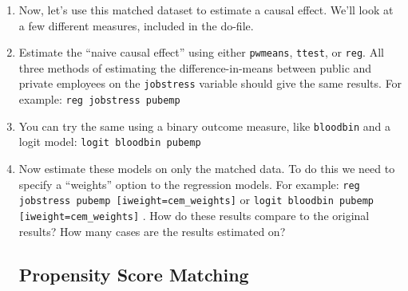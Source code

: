 \documentclass[a4paper,12pt]{article}
\begin{document}
\begin{enumerate}
\item Now, let's use this matched dataset to estimate a causal effect. We'll look at a few different measures, included in the do-file.
\item Estimate the ``naive causal effect'' using either \texttt{pwmeans}, \texttt{ttest}, or \texttt{reg}. All three methods of estimating the difference-in-means between public and private employees on the \texttt{jobstress} variable should give the same results. For example: \texttt{reg jobstress pubemp}
\item You can try the same using a binary outcome measure, like \texttt{bloodbin} and a logit model: \texttt{logit bloodbin pubemp}
\item Now estimate these models on only the matched data. To do this we need to specify a ``weights'' option to the regression models. For example: \texttt{reg jobstress pubemp [iweight=cem\_weights]} or \texttt{logit bloodbin pubemp [iweight=cem\_weights]} . How do these results compare to the original results? How many cases are the results estimated on?

\subsection*{Propensity Score Matching}


\end{enumerate}
\end{document}
